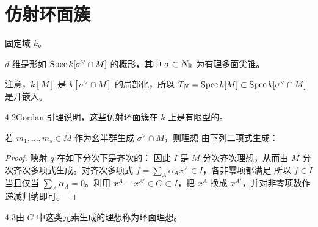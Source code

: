 \section{仿射环面簇}
固定域 $k$。
\begin{definition}\label{def:4.4}
$d$ 维是形如 $\operatorname{Spec} k[\sigma^\vee\cap M]$ 的概形，其中 $\sigma\subset N_{\mathbb R}$ 为有理多面尖锥。
\end{definition}
注意，$k[M]$ 是 $k[\sigma^\vee\cap M]$ 的局部化，所以 $T_N=\operatorname{Spec} k[M]\subset\operatorname{Spec} k[\sigma^\vee\cap M]$ 是开嵌入。
\begin{Note}{4.2}Gordan 引理说明，这些仿射环面簇在 $k$ 上是有限型的。\end{Note}
\begin{proposition}\label{prop:4.3}
若 $m_1,\ldots,m_s\in M$ 作为幺半群生成 $\sigma^\vee\cap M$，则理想
由下列二项式生成：
\end{proposition}
\begin{proof}
映射 $q$ 在如下分次下是齐次的：
因此 $I$ 是 $M$ 分次齐次理想，从而由 $M$ 分次齐次多项式生成。对齐次多项式 $f=\sum_A\alpha_Ax^A\in I$，各非零项都满足
所以 $f\in I$ 当且仅当 $\sum_A\alpha_A=0$。利用 $x^A-x^{A'}\in G\subset I$，把 $x^A$ 换成 $x^{A'}$，并对非零项数作递减归纳即可。
\end{proof}
\begin{Note}{4.3}由 $G$ 中这类元素生成的理想称为环面理想。\end{Note}
